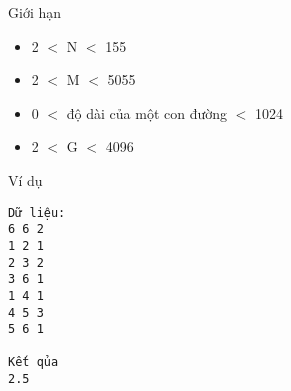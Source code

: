 Giới hạn  
\begin{itemize}
	\item     2 $<$ N $<$ 155   
	\item     2 $<$ M $<$ 5055   
	\item     0 $<$ độ dài của một con đường $<$ 1024   
	\item     2 $<$ G $<$ 4096   
\end{itemize}
   Ví dụ  
\begin{verbatim}
Dữ liệu:
6 6 2
1 2 1
2 3 2
3 6 1
1 4 1
4 5 3
5 6 1

Kết qủa
2.5
\end{verbatim}